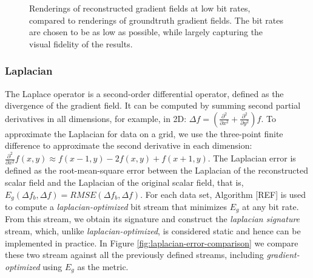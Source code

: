 \begin{figure}[h]
	\caption{Renderings of reconstructed gradient fields at low bit rates, compared to renderings of groundtruth gradient fields. The bit rates are chosen to be as low as possible, while largely capturing the visual fidelity of the results.}
  \label{fig:gradient-renderings}
\end{figure}


\subsubsection{Laplacian}
\label{sec:laplacian}

The Laplace operator is a second-order differential operator, defined as the divergence of the
gradient field. It can be computed by summing second partial derivatives in all dimensions, for
example, in 2D: $\Delta f=(\frac{{\partial}^2}{\partial{x^2}}+\frac{{\partial}^2}{\partial{y^2}})f$.
To approximate the Laplacian for data on a grid, we use the three-point finite difference to
approximate the second derivative in each dimension: $\frac{{\partial}^2}{\partial{x^2}}f(x,y)
\approx f(x-1,y)-2f(x,y)+f(x+1,y)$. The Laplacian error is defined as the root-mean-square error
between the Laplacian of the reconstructed scalar field and the Laplacian of the original scalar
field, that is, $E_g(\Delta f_b,\Delta f)=RMSE(\Delta f_b,\Delta f)$. For each data set, Algorithm
[REF] is used to compute a \emph{laplacian-optimized} bit stream that minimizes $E_g$ at any bit
rate. From this stream, we obtain its signature and construct the \emph{laplacian signature} stream,
which, unlike \emph{laplacian-optimized}, is considered static and hence can be implemented in
practice. In Figure \ref{fig:laplacian-error-comparison} we compare these two stream against all the
previously defined streams, including \emph{gradient-optimized} using $E_g$ as the metric.

